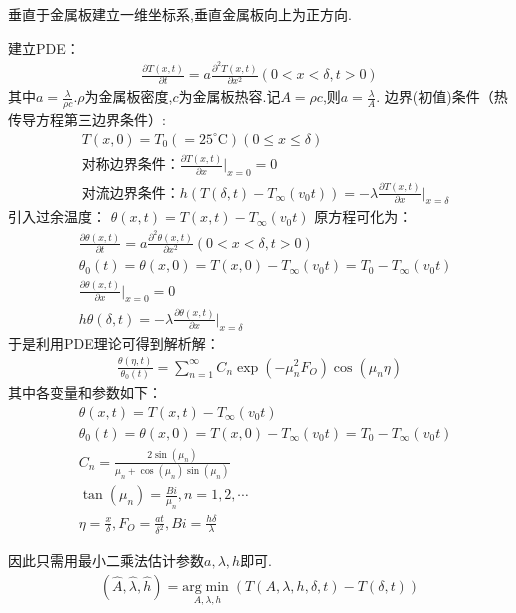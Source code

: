 \documentclass[lang=cn,newtx,10pt,scheme=chinese]{../../Template/elegantbook}
\begin{document}
垂直于金属板建立一维坐标系,垂直金属板向上为正方向.

建立PDE：
\begin{align*}
\frac{\partial T(x,t)}{\partial t}=a\frac{\partial ^2T(x,t)}{\partial x^2}(0<x<\delta,t>0)
\end{align*}
其中$a=\frac{\lambda}{\rho c}$.$\rho$为金属板密度,$c$为金属板热容.记$A=\rho c$,则$a=\frac{\lambda}{A}.$
边界(初值)条件（热传导方程第三边界条件）:
\begin{align*}
&T(x,0)=T_0(=25^{\circ}\mathrm{C})(0\leqslant x\leqslant \delta)
\\
&\text{对称边界条件：}\frac{\partial T(x,t)}{\partial x}\Big|_{x = 0}=0
\\
&\text{对流边界条件：}h(T(\delta,t) - T_{\infty}(v_0t)) = -\lambda\frac{\partial T(x,t)}{\partial x}\Big|_{x = \delta}
\end{align*}
引入过余温度：
$\theta(x,t)=T(x,t)-T_{\infty}(v_0t)$
原方程可化为：
\begin{align*}
&\frac{\partial \theta(x,t)}{\partial t}=a\frac{\partial ^2\theta(x,t)}{\partial x^2}(0<x<\delta,t>0)\\
&\theta_0(t)=\theta(x,0)=T(x,0)-T_{\infty}(v_0t)=T_0-T_{\infty}(v_0t)\\
&\frac{\partial \theta(x,t)}{\partial x}\Big|_{x = 0}=0\\
&h\theta(\delta,t)=-\lambda\frac{\partial \theta(x,t)}{\partial x}\Big|_{x = \delta}
\end{align*}
于是利用PDE理论可得到解析解：
\begin{align}\label{1.1}
\frac{\theta(\eta,t)}{\theta_0(t)}=\sum_{n = 1}^{\infty}{C_n\exp(-\mu_{n}^{2}F_O)\cos(\mu_n\eta)}
\end{align}
其中各变量和参数如下：
\begin{align*}
&\theta(x,t)=T(x,t)-T_{\infty}(v_0t)\\
&\theta_0(t)=\theta(x,0)=T(x,0)-T_{\infty}(v_0t)=T_0-T_{\infty}(v_0t)\\
&C_n=\frac{2\sin(\mu_n)}{\mu_n+\cos(\mu_n)\sin(\mu_n)}\\
&\tan(\mu_n)=\frac{Bi}{\mu_n},n = 1,2,\cdots\\
&\eta=\frac{x}{\delta},F_O=\frac{at}{\delta ^2},Bi=\frac{h\delta}{\lambda}
\end{align*}

因此只需用最小二乘法估计参数$a,\lambda,h$即可.
\begin{align*}
\left( \widehat{A},\widehat{\lambda },\widehat{h} \right) =\underset{A,\lambda ,h}{\mathrm{arg}\min}\left( T\left( A,\lambda ,h,\delta,t \right) -T\left( \delta,t \right) \right) 
\end{align*}
\end{document}
